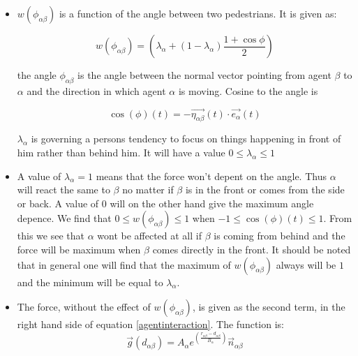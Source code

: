 \begin{itemize}
\item $w\left(\phi_{\alpha \beta}\right)$ is a function of the angle between two pedestrians. It is given as: 

\begin{equation}
    w\left(\phi_{\alpha \beta}\right)=
    \left(
        \lambda_{\alpha} + \left(
            1 - \lambda_{\alpha}
        \right)
		\frac{1+\cos{\phi}}{2}
    \right) 
    \label{angleAB}
\end{equation}

the angle $\phi_{\alpha \beta}$ is the angle between the normal 
vector pointing from agent $\beta$ to $\alpha$ and the direction in which 
agent $\alpha$ is moving. Cosine to the angle is 

\begin{equation}
\cos \left( \phi \right)
	\left( t \right) 
		= 
	- \vec{\eta_{\alpha \beta}}
		\left( t \right) 
	\cdot 
\vec{e_{\alpha}}\left( t \right)
\end{equation}

$\lambda_{\alpha}$ is governing a persons tendency to focus on things happening in front of him 
rather than behind him. It will have a value  $0\leq \lambda_{\alpha}\leq 1$

\item A value of $\lambda_{\alpha}=1$ means that the force won't depent on the angle. Thus $\alpha$ will react the same to $\beta$ no matter if $\beta$ is in the front or comes from the side or back. A value of $0$ will on the other hand give the maximum angle depence. We find that $0\leq w\left(\phi_{\alpha \beta}\right)\leq1$ when $-1 \leq \cos \left( \phi \right) \left( t \right) \leq 1$. From this we see that $\alpha$ wont be affected at all if $\beta$ is coming from behind and the force will be maximum when $\beta$ comes directly in the front. It should be noted that in general one will find that the maximum of $w\left(\phi_{\alpha \beta}\right)$ always will be $1$ and the minimum will be equal to $\lambda_{\alpha}$.   


\item The force, without the effect of $w\left(\phi_{\alpha \beta}\right)$, is given as the second term, in the right hand side of equation \ref{agentinteraction}. The function is:  
\begin{equation}
	\vec{g} 
	\left(
	d_{\alpha \beta}
	\right)
	=
	 A_{\alpha} e^{ \left(\frac{ r_{\alpha \beta} - d_{\alpha \beta}}{B_{\alpha}}\right)}
	\vec{n}_{\alpha \beta}
	        \label{re}	
\end{equation}


\end{itemize}
